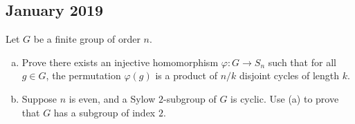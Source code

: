 \documentclass[10pt]{mypackage}
\begin{document}
\subsection{January 2019}%
\begin{problem}[Problem 2]
  Let $G$ be a finite group of order $n$.
  \begin{enumerate}[(a)]
    \item Prove there exists an injective homomorphism $\varphi\colon G\rightarrow S_n$ such that for all $g\in G$, the permutation $\varphi(g)$ is a product of $n/k$ disjoint cycles of length $k$.
    \item Suppose $n$ is even, and a Sylow $2$-subgroup of $G$ is cyclic. Use (a) to prove that $G$ has a subgroup of index $2$.
  \end{enumerate}
\end{problem}
\end{document}

